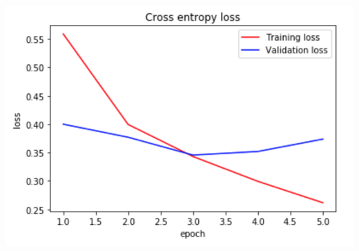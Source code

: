 \documentclass[12pt,letterpaper]{article}
\begin{document}
\includegraphics[scale=0.58]{DRLSTMxent.png} \\
\end{document}
